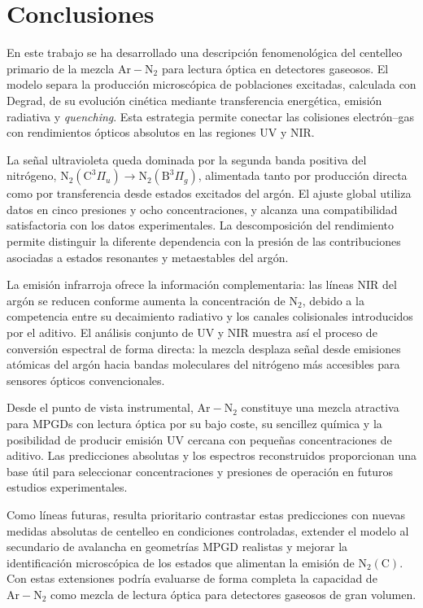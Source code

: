 \documentclass[12pt,a4paper]{article}
\newcommand{\N}{\mathrm{N}}
\newcommand{\Ar}{\mathrm{Ar}}
\begin{document}
\section{Conclusiones}

En este trabajo se ha desarrollado una descripción fenomenológica del centelleo primario de la mezcla $\Ar-\N_2$ para lectura óptica en detectores gaseosos. El modelo separa la producción microscópica de poblaciones excitadas, calculada con Degrad, de su evolución cinética mediante transferencia energética, emisión radiativa y \emph{quenching}. Esta estrategia permite conectar las colisiones electrón--gas con rendimientos ópticos absolutos en las regiones UV y NIR.

La señal ultravioleta queda dominada por la segunda banda positiva del nitrógeno, $\N_2(\mathrm{C}^3\Pi_u)\rightarrow\N_2(\mathrm{B}^3\Pi_g)$, alimentada tanto por producción directa como por transferencia desde estados excitados del argón. El ajuste global utiliza datos en cinco presiones y ocho concentraciones, y alcanza una compatibilidad satisfactoria con los datos experimentales. La descomposición del rendimiento permite distinguir la diferente dependencia con la presión de las contribuciones asociadas a estados resonantes y metaestables del argón.

La emisión infrarroja ofrece la información complementaria: las líneas NIR del argón se reducen conforme aumenta la concentración de N$_2$, debido a la competencia entre su decaimiento radiativo y los canales colisionales introducidos por el aditivo. El análisis conjunto de UV y NIR muestra así el proceso de conversión espectral de forma directa: la mezcla desplaza señal desde emisiones atómicas del argón hacia bandas moleculares del nitrógeno más accesibles para sensores ópticos convencionales.

Desde el punto de vista instrumental, $\Ar-\N_2$ constituye una mezcla atractiva para MPGDs con lectura óptica por su bajo coste, su sencillez química y la posibilidad de producir emisión UV cercana con pequeñas concentraciones de aditivo. Las predicciones absolutas y los espectros reconstruidos proporcionan una base útil para seleccionar concentraciones y presiones de operación en futuros estudios experimentales.

Como líneas futuras, resulta prioritario contrastar estas predicciones con nuevas medidas absolutas de centelleo en condiciones controladas, extender el modelo al secundario de avalancha en geometrías MPGD realistas y mejorar la identificación microscópica de los estados que alimentan la emisión de $\N_2(\mathrm{C})$. Con estas extensiones podría evaluarse de forma completa la capacidad de $\Ar-\N_2$ como mezcla de lectura óptica para detectores gaseosos de gran volumen.


\printbibliography
{}
\end{document}
